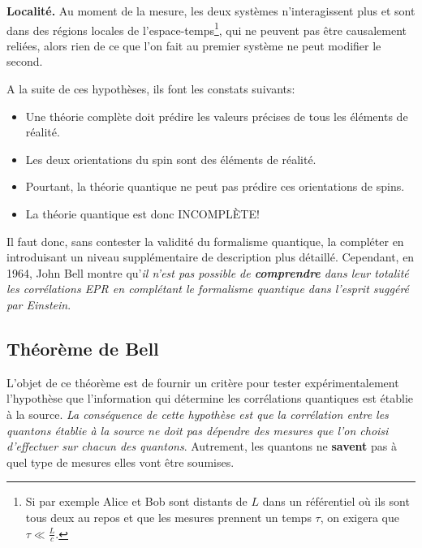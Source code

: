 \begin{principe}
\textbf{Localité.} Au moment de la mesure, les deux systèmes n'interagissent
plus et sont dans des régions locales de l'espace-temps\footnote{Si par exemple
Alice et Bob sont distants de $L$ dans un référentiel où ils sont tous deux au
repos et que les mesures prennent un temps $\tau$, on exigera que
$\tau\ll\frac{L}{c}$.}, qui ne peuvent pas être causalement reliées, alors rien
de ce que l'on fait au premier système ne peut modifier le second.
\end{principe}

A la suite de ces hypothèses, ils font les constats suivants:

\begin{itemize}
\item Une théorie complète doit prédire les valeurs précises de tous les
éléments de réalité.

\item Les deux orientations du spin sont des éléments de réalité.

\item Pourtant, la théorie quantique ne peut pas prédire ces orientations de
spins.

\item La théorie quantique est donc INCOMPLÈTE!
\end{itemize}

Il faut donc, sans contester la validité du formalisme quantique, la compléter
en introduisant un niveau supplémentaire de description plus détaillé.
Cependant, en 1964, John Bell montre qu'\emph{il n'est pas possible de
\textbf{comprendre} dans leur totalité les corrélations EPR en complétant le
formalisme quantique dans l'esprit suggéré par Einstein}.


\subsection{Théorème de Bell}

L'objet de ce théorème est de fournir un critère pour tester expérimentalement
l'hypothèse que l'information qui détermine les corrélations quantiques est
établie à la source. \emph{La conséquence de cette hypothèse est que la
corrélation entre les quantons établie à la source ne doit pas dépendre des
mesures que l'on choisi d'effectuer sur chacun des quantons}. Autrement, les
quantons ne \textbf{savent} pas à quel type de mesures elles vont être soumises.

